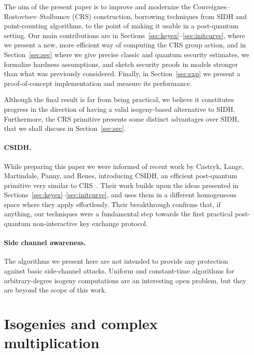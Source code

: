 \documentclass{llncs}
\begin{document}
The aim of the present paper is to improve and modernize the
Couveignes--Rostovtsev--Stolbunov (CRS) construction, borrowing
techniques from SIDH and point-counting algorithms, to the point of
making it usable in a post-quantum setting.  Our main contributions
are in Sections~\ref{sec:keyex}--\ref{sec:initcurve}, where we present
a new, more efficient way of computing the CRS group action, and in
Section~\ref{sec:sec} where we give precise classic and quantum
security estimates, we formalize hardness assumptions, and sketch
security proofs in models stronger than what was previously
considered.
Finally, in Section~\ref{sec:exp} we present a
proof-of-concept implementation and measure its performance.



Although the final result is far from being practical, we believe it
constitutes progress in the direction of having a valid isogeny-based
alternative to SIDH.  Furthermore, the CRS primitive presents some
distinct advantages over SIDH, that we shall discuss in
Section~\ref{sec:sec}. 

\paragraph{CSIDH.}
While preparing this paper we were informed of
recent work by Castryk, Lange, Martindale, Panny, and Renes,
introducing CSIDH, 
an efficient post-quantum primitive very similar to CRS~\cite{csidh}.
Their work builds upon the ideas presented in
Sections~\ref{sec:keyex}--\ref{sec:initcurve}, and uses them in a
different homogeneous space where they apply effortlessly.  Their
breakthrough confirms that, if anything, our techniques were a
fundamental step towards the first practical post-quantum
non-interactive key exchange protocol.

\paragraph{Side channel awareness.}
The algorithms we present here are not intended to provide any protection
against basic side-channel attacks.  
Uniform and constant-time algorithms for arbitrary-degree isogeny computations
are an interesting open problem,
but they are beyond the scope of this work.

\section{Isogenies and complex multiplication}
\label{sec:math}
\end{document}
